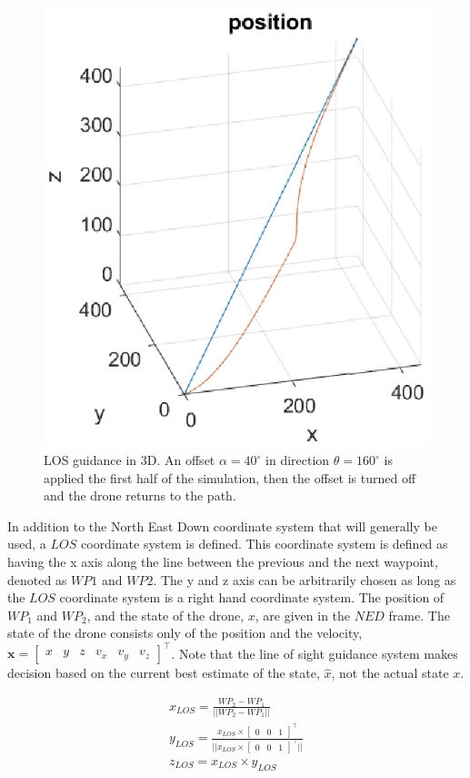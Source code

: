 \begin{figure}[t]
    \centering
    \includegraphics[width = 0.8\linewidth]{Figures/3dlos}
    \caption{LOS guidance in 3D. An offset $\alpha = 40^\circ$ in direction $\theta=160^\circ$ is applied the first half of the simulation, then the offset is turned off and the drone returns to the path.}
    \label{fig:LOS_guidance}
\end{figure}

In addition to the North East Down coordinate system that will generally be used, a $LOS$ coordinate system is defined. This coordinate system is defined as having the x axis along the line between the previous and the next waypoint, denoted as $WP1$ and $WP2$. The y and z axis can be arbitrarily chosen as long as the $LOS$ coordinate system is a right hand coordinate system. The position of $WP_1$ and $WP_2$, and the state of the drone, $x$, are given in the $NED$ frame. The state of the drone consists only of the position and the velocity, $\textbf{x} = \begin{bmatrix} x & y & z & v_x & v_y & v_z\end{bmatrix}^\top$. Note that the line of sight guidance system makes decision based on the current best estimate of the state, $\hat{x}$, not the actual state $x$.

\begin{align}
    x_{LOS} = \frac{WP_2 - WP_1}{||WP_2 - WP_1||} \\
    y_{LOS} = \frac{x_{LOS} \times \begin{bmatrix} 0&0&1\end{bmatrix}^\top}{|| x_{LOS} \times \begin{bmatrix} 0&0&1\end{bmatrix}^\top ||}\label{y_los}\\ 
    z_{LOS} = x_{LOS} \times y_{LOS}
\end{align}

